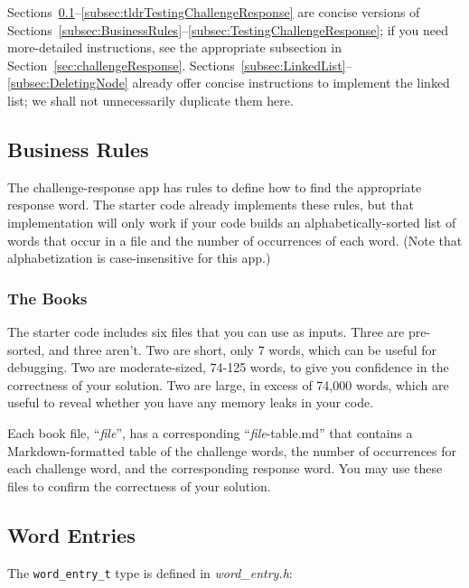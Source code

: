 Sections~\ref{subsec:tldrBusinessRules}--\ref{subsec:tldrTestingChallengeResponse} are concise versions of Sections~\ref{subsec:BusinessRules}--\ref{subsec:TestingChallengeResponse};
if you need more-detailed instructions, see the appropriate subsection in Section~\ref{sec:challengeResponse}.
Sections~\ref{subsec:LinkedList}--\ref{subsec:DeletingNode} already offer concise instructions to implement the linked list;
we shall not unnecessarily duplicate them here.

\subsection{Business Rules} \label{subsec:tldrBusinessRules}

    The challenge-response app has rules to define how to find the appropriate response word.
    The starter code already implements these rules, but that implementation will only work if your code builds an alphabetically-sorted list of words that occur in a file and the number of occurrences of each word.
    (Note that alphabetization is case-insensitive for this app.)

    \subsubsection*{The Books}

        The starter code includes six files that you can use as inputs.
        Three are pre-sorted, and three aren't.
        Two are short, only 7 words, which can be useful for debugging.
        Two are moderate-sized, 74-125 words, to give you confidence in the correctness of your solution.
        Two are large, in excess of 74,000 words, which are useful to reveal whether you have any memory leaks in your code.

        Each book file, ``\textit{file}'', has a corresponding ``\textit{file}-table.md'' that contains a Markdown-formatted table of the challenge words, the number of occurrences for each challenge word, and the corresponding response word.
        You may use these files to confirm the correctness of your solution.


\subsection{Word Entries}

    The \lstinline{word_entry_t} type is defined in \textit{word\_entry.h}:

    

